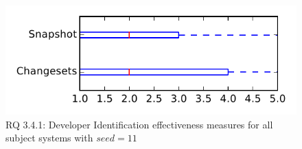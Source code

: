 
\begin{figure}
\centering
\includegraphics[height=0.4\textheight]{figures/dit_seed/rq1_tiny_11}
\caption{RQ 3.4.1: Developer Identification effectiveness measures for all subject systems with $seed=11$}
\label{fig:dit_seed:rq1:tiny}
\end{figure}

